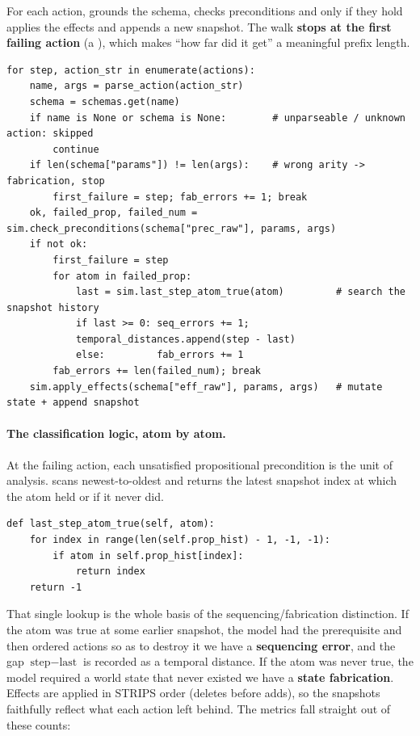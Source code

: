For each action,  grounds the schema, checks
preconditions and only if they hold applies the effects and appends a
new snapshot. The walk \textbf{stops at the first failing action} (a
), which makes ``how far did it get'' a meaningful prefix length.

\begin{lstlisting}
for step, action_str in enumerate(actions):
    name, args = parse_action(action_str)
    schema = schemas.get(name)
    if name is None or schema is None:        # unparseable / unknown action: skipped
        continue
    if len(schema["params"]) != len(args):    # wrong arity -> fabrication, stop
        first_failure = step; fab_errors += 1; break
    ok, failed_prop, failed_num = sim.check_preconditions(schema["prec_raw"], params, args)
    if not ok:
        first_failure = step
        for atom in failed_prop:
            last = sim.last_step_atom_true(atom)         # search the snapshot history
            if last >= 0: seq_errors += 1; 
            temporal_distances.append(step - last)
            else:         fab_errors += 1
        fab_errors += len(failed_num); break
    sim.apply_effects(schema["eff_raw"], params, args)   # mutate state + append snapshot
\end{lstlisting}

\paragraph{The classification logic, atom by atom.} At the failing action, each
unsatisfied propositional precondition is the unit of analysis.
 scans  newest-to-oldest and
returns the latest snapshot index at which the atom held or  if it never did.

\begin{lstlisting}
def last_step_atom_true(self, atom):
    for index in range(len(self.prop_hist) - 1, -1, -1):
        if atom in self.prop_hist[index]:
            return index
    return -1
\end{lstlisting}

That single lookup is the whole basis of the sequencing/fabrication distinction.
If the atom was true at some earlier snapshot, the model had the prerequisite
and then ordered actions so as to destroy it we have a \textbf{sequencing error},
and the gap $\text{step}-\text{last}$ is recorded as a temporal distance. If the
atom was never true, the model required a world state that never existed we have a
\textbf{state fabrication}. Effects are applied in STRIPS order (deletes before
adds), so the snapshots faithfully reflect what each action left behind. The
metrics fall straight out of these counts:

